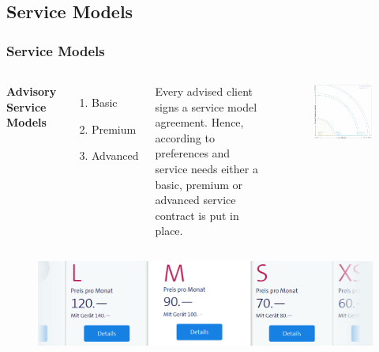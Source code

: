 \documentclass{beamer}\usepackage[]{graphicx}\usepackage[]{color}
\begin{document}
\subsection{Service Models}
\begin{frame}[fragile]
\frametitle{Service Models}
\begin{columns}[c] %



\textbf{Advisory Service Models}
\begin{enumerate}
\item Basic
\item Premium
\item Advanced
\end{enumerate}

Every advised client signs a service model agreement. Hence, according to preferences and service needs either a basic, premium or advanced service contract is put in place. 


\begin{figure}
	\includegraphics[width=\linewidth]{service_model.png}
\end{figure}

\end{columns}

\begin{figure}
	\includegraphics[width=0.5\linewidth]{swisscom.png}
\end{figure}

\end{frame}
\end{document}
